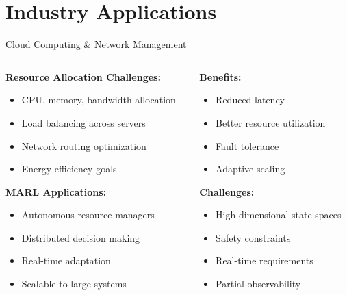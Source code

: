 \documentclass[aspectratio=169]{beamer}
\begin{document}
\section{Industry Applications}

\begin{frame}{Cloud Computing \& Network Management}
    
    \begin{columns}
        \begin{column}{0.6\textwidth}
            \textbf{Resource Allocation Challenges:}
            \begin{itemize}
                \item CPU, memory, bandwidth allocation
                \item Load balancing across servers
                \item Network routing optimization
                \item Energy efficiency goals
            \end{itemize}
            
            \vfill
            \textbf{MARL Applications:} \autocite{zhang_multi-agent_2025}
            \begin{itemize}
                \item Autonomous resource managers
                \item Distributed decision making
                \item Real-time adaptation
                \item Scalable to large systems
            \end{itemize}
        \end{column}
        \begin{column}{0.4\textwidth}
            \textbf{Benefits:}
            \begin{itemize}
                \item Reduced latency
                \item Better resource utilization
                \item Fault tolerance
                \item Adaptive scaling
            \end{itemize}
            
            \vfill
            \textbf{Challenges:}
            \begin{itemize}
                \item High-dimensional state spaces
                \item Safety constraints
                \item Real-time requirements
                \item Partial observability
            \end{itemize}
        \end{column}
    \end{columns}
\end{frame}
\end{document}
